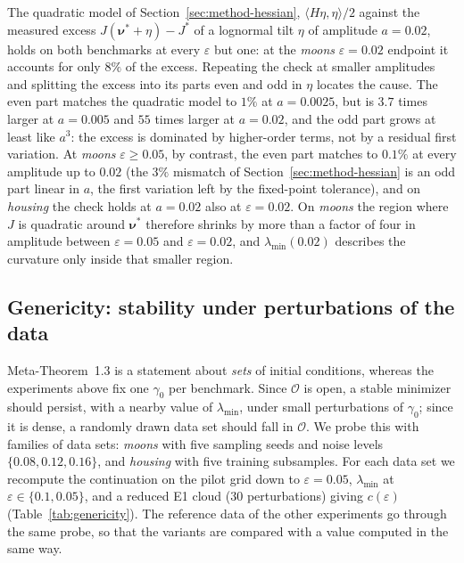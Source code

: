 \documentclass[11pt,leqno]{amsart}
\newcommand{\cO}{\mathcal{O}}
\newcommand{\bnu}{\boldsymbol{\nu}}
\newcommand{\eps}{\varepsilon}
\numberwithin{equation}{section}
\theoremstyle{definition}
\begin{document}
The quadratic model of Section~\ref{sec:method-hessian},
$\langle H\eta,\eta\rangle/2$ against the measured excess $J(\bnu^*+\eta)-J^*$
of a lognormal tilt $\eta$ of amplitude $a=0.02$, holds on both benchmarks
at every $\eps$ but one: at the \emph{moons} $\eps=0.02$ endpoint it
accounts for only $8\%$ of the excess.  Repeating the check at smaller amplitudes and
splitting the excess into its parts even and odd in $\eta$ locates the
cause.  The even part matches the quadratic model to $1\%$ at $a=0.0025$,
but is $3.7$ times larger at $a=0.005$ and $55$ times larger at $a=0.02$,
and the odd part grows at least like $a^3$: the excess is dominated by
higher-order terms, not by a residual first variation.  At \emph{moons}
$\eps\ge0.05$, by contrast, the even part matches to $0.1\%$ at every
amplitude up to $0.02$ (the $3\%$ mismatch of
Section~\ref{sec:method-hessian} is an odd part linear in $a$, the first
variation left by the fixed-point tolerance), and on \emph{housing} the
check holds at $a=0.02$ also at $\eps=0.02$.  On \emph{moons} the region
where $J$ is quadratic around $\bnu^*$ therefore shrinks by more than a
factor of four in amplitude between $\eps=0.05$ and $\eps=0.02$, and
$\lambda_{\min}(0.02)$ describes the curvature only inside that smaller
region.

\subsection{Genericity: stability under perturbations of the data}
\label{sec:genericity}
Meta-Theorem~1.3 is a statement about \emph{sets} of initial conditions,
whereas the experiments above fix one $\gamma_0$ per benchmark.  Since $\cO$
is open, a stable minimizer should persist, with a nearby value of
$\lambda_{\min}$, under small perturbations of $\gamma_0$; since it is
dense, a randomly drawn data set should fall in $\cO$.  We probe this with
families of data sets:
\emph{moons} with five sampling seeds and noise levels
$\{0.08,0.12,0.16\}$, and \emph{housing} with five training subsamples.  For
each data set we recompute the continuation on the pilot grid down to
$\eps=0.05$, $\lambda_{\min}$ at $\eps\in\{0.1,0.05\}$, and a reduced E1
cloud ($30$ perturbations) giving $c(\eps)$ (Table~\ref{tab:genericity}).
The reference data of the other experiments go through the same probe, so
that the variants are compared with a value computed in the same way.
\end{document}
